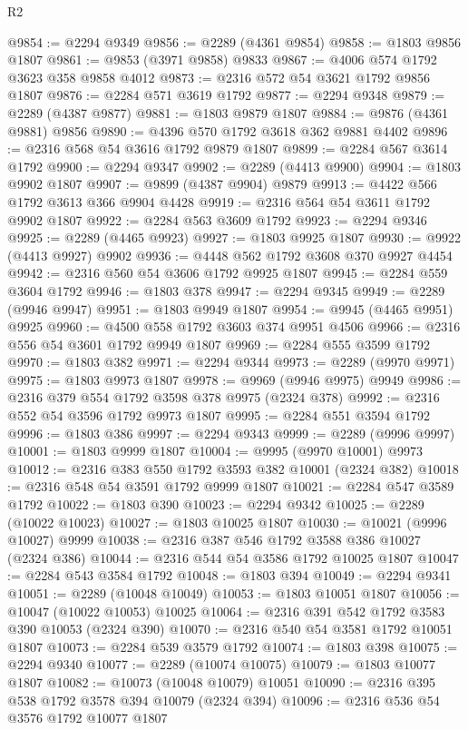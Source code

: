 \begin{lexlean}{R2}
\begin{coremodule}
@9854 := @2294 @9349
@9856 := @2289 (@4361 @9854)
@9858 := @1803 @9856 @1807
@9861 := @9853 (@3971 @9858) @9833
@9867 := @4006 @574 @1792 @3623 @358 @9858 @4012
@9873 := @2316 @572 @54 @3621 @1792 @9856 @1807
@9876 := @2284 @571 @3619 @1792
@9877 := @2294 @9348
@9879 := @2289 (@4387 @9877)
@9881 := @1803 @9879 @1807
@9884 := @9876 (@4361 @9881) @9856
@9890 := @4396 @570 @1792 @3618 @362 @9881 @4402
@9896 := @2316 @568 @54 @3616 @1792 @9879 @1807
@9899 := @2284 @567 @3614 @1792
@9900 := @2294 @9347
@9902 := @2289 (@4413 @9900)
@9904 := @1803 @9902 @1807
@9907 := @9899 (@4387 @9904) @9879
@9913 := @4422 @566 @1792 @3613 @366 @9904 @4428
@9919 := @2316 @564 @54 @3611 @1792 @9902 @1807
@9922 := @2284 @563 @3609 @1792
@9923 := @2294 @9346
@9925 := @2289 (@4465 @9923)
@9927 := @1803 @9925 @1807
@9930 := @9922 (@4413 @9927) @9902
@9936 := @4448 @562 @1792 @3608 @370 @9927 @4454
@9942 := @2316 @560 @54 @3606 @1792 @9925 @1807
@9945 := @2284 @559 @3604 @1792
@9946 := @1803 @378
@9947 := @2294 @9345
@9949 := @2289 (@9946 @9947)
@9951 := @1803 @9949 @1807
@9954 := @9945 (@4465 @9951) @9925
@9960 := @4500 @558 @1792 @3603 @374 @9951 @4506
@9966 := @2316 @556 @54 @3601 @1792 @9949 @1807
@9969 := @2284 @555 @3599 @1792
@9970 := @1803 @382
@9971 := @2294 @9344
@9973 := @2289 (@9970 @9971)
@9975 := @1803 @9973 @1807
@9978 := @9969 (@9946 @9975) @9949
@9986 := @2316 @379 @554 @1792 @3598 @378 @9975 (@2324 @378)
@9992 := @2316 @552 @54 @3596 @1792 @9973 @1807
@9995 := @2284 @551 @3594 @1792
@9996 := @1803 @386
@9997 := @2294 @9343
@9999 := @2289 (@9996 @9997)
@10001 := @1803 @9999 @1807
@10004 := @9995 (@9970 @10001) @9973
@10012 := @2316 @383 @550 @1792 @3593 @382 @10001 (@2324 @382)
@10018 := @2316 @548 @54 @3591 @1792 @9999 @1807
@10021 := @2284 @547 @3589 @1792
@10022 := @1803 @390
@10023 := @2294 @9342
@10025 := @2289 (@10022 @10023)
@10027 := @1803 @10025 @1807
@10030 := @10021 (@9996 @10027) @9999
@10038 := @2316 @387 @546 @1792 @3588 @386 @10027 (@2324 @386)
@10044 := @2316 @544 @54 @3586 @1792 @10025 @1807
@10047 := @2284 @543 @3584 @1792
@10048 := @1803 @394
@10049 := @2294 @9341
@10051 := @2289 (@10048 @10049)
@10053 := @1803 @10051 @1807
@10056 := @10047 (@10022 @10053) @10025
@10064 := @2316 @391 @542 @1792 @3583 @390 @10053 (@2324 @390)
@10070 := @2316 @540 @54 @3581 @1792 @10051 @1807
@10073 := @2284 @539 @3579 @1792
@10074 := @1803 @398
@10075 := @2294 @9340
@10077 := @2289 (@10074 @10075)
@10079 := @1803 @10077 @1807
@10082 := @10073 (@10048 @10079) @10051
@10090 := @2316 @395 @538 @1792 @3578 @394 @10079 (@2324 @394)
@10096 := @2316 @536 @54 @3576 @1792 @10077 @1807

\end{coremodule}
\end{lexlean}
